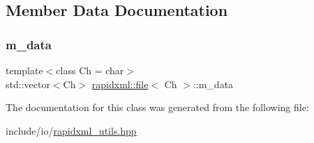 \subsection{Member Data Documentation}
\mbox{\label{classrapidxml_1_1file_a60c4a72a55bbf4dbcca07f251a09cddf}} 
\subsubsection{\texorpdfstring{m\_data}{m\_data}}
{\footnotesize\ttfamily template$<$class Ch  = char$>$ \\
std\+::vector$<$Ch$>$ \mbox{\hyperlink{classrapidxml_1_1file}{rapidxml\+::file}}$<$ Ch $>$\+::m\+\_\+data\hspace{0.3cm}{\ttfamily [private]}}



The documentation for this class was generated from the following file\+:\begin{DoxyCompactItemize}
\item 
include/io/\mbox{\hyperlink{rapidxml__utils_8hpp}{rapidxml\+\_\+utils.\+hpp}}\end{DoxyCompactItemize}
